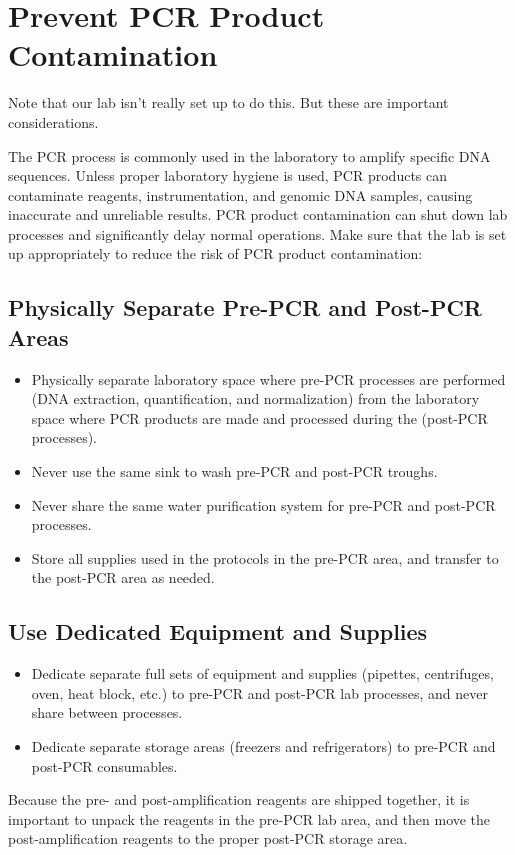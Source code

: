 \documentclass[11pt, oneside]{article}
\begin{document}
\section{Prevent PCR Product Contamination}
Note that our lab isn't really set up to do this.  But these are important considerations.

The PCR process is commonly used in the laboratory to amplify specific DNA sequences. Unless proper laboratory hygiene is used, PCR products can contaminate reagents, instrumentation, and genomic DNA samples, causing inaccurate and unreliable results. PCR product contamination can shut down lab processes and significantly delay normal operations.
Make sure that the lab is set up appropriately to reduce the risk of PCR product contamination:
	\subsection{ Physically Separate Pre-PCR and Post-PCR Areas}
		\begin{itemize}
			\item Physically separate laboratory space where pre-PCR processes are performed
(DNA extraction, quantification, and normalization) from the laboratory space where PCR products are made and processed during the (post-PCR processes).
			\item Never use the same sink to wash pre-PCR and post-PCR troughs.
			\item Never share the same water purification system for pre-PCR and post-PCR
processes.
			\item Store all supplies used in the protocols in the pre-PCR area, and transfer to
the post-PCR area as needed.
		\end{itemize}
	\subsection {Use Dedicated Equipment and Supplies	}
		\begin{itemize}
			\item Dedicate separate full sets of equipment and supplies (pipettes, centrifuges, oven, heat block, etc.) to pre-PCR and post-PCR lab processes, and never share between processes.
			\item Dedicate separate storage areas (freezers and refrigerators) to pre-PCR and post-PCR consumables.
		\end{itemize}
			
Because the pre- and post-amplification reagents are shipped together, it is important to unpack the reagents in the pre-PCR lab area, and then move the post-amplification reagents to the proper post-PCR storage area.
	
\end{document}
